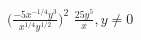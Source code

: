 {$\displaystyle \Bigg( \frac{-5x^{-1/4}y^3}{x^{1/4}y^{1/2}}\Bigg)^2$}
{$\displaystyle \frac{25y^5}{x}, y \neq 0$}
